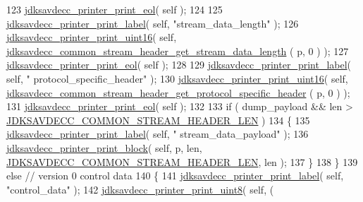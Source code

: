 \begin{DoxyCode}
123                 \hyperlink{group__util_gacda56c9d3d24593a52c999682fa6e6e3}{jdksavdecc\_printer\_print\_eol}( \textcolor{keyword}{self} );
124 
125                 \hyperlink{group__util_gaf7818b24143b3c7502926a425a242ff5}{jdksavdecc\_printer\_print\_label}( \textcolor{keyword}{self}, \textcolor{stringliteral}{"stream\_data\_length"} );
126                 \hyperlink{group__util_ga9793e0ff8e7ed25d957282ee6b257ce2}{jdksavdecc\_printer\_print\_uint16}( \textcolor{keyword}{self}, 
      \hyperlink{group__jdksavdecc__avtp__common__stream__header_ga1457308e7d42adb713a5f130497c9153}{jdksavdecc\_common\_stream\_header\_get\_stream\_data\_length}
      ( p, 0 ) );
127                 \hyperlink{group__util_gacda56c9d3d24593a52c999682fa6e6e3}{jdksavdecc\_printer\_print\_eol}( \textcolor{keyword}{self} );
128 
129                 \hyperlink{group__util_gaf7818b24143b3c7502926a425a242ff5}{jdksavdecc\_printer\_print\_label}( \textcolor{keyword}{self}, \textcolor{stringliteral}{"
      protocol\_specific\_header"} );
130                 \hyperlink{group__util_ga9793e0ff8e7ed25d957282ee6b257ce2}{jdksavdecc\_printer\_print\_uint16}( \textcolor{keyword}{self}, 
      \hyperlink{group__jdksavdecc__avtp__common__stream__header_ga1c1c9e3403005799cc13be253a2fd91f}{jdksavdecc\_common\_stream\_header\_get\_protocol\_specific\_header}
      ( p, 0 ) );
131                 \hyperlink{group__util_gacda56c9d3d24593a52c999682fa6e6e3}{jdksavdecc\_printer\_print\_eol}( \textcolor{keyword}{self} );
132 
133                 \textcolor{keywordflow}{if} ( dump\_payload && len > \hyperlink{group__jdksavdecc__avtp__common__stream__header_ga615d40bf9d23486c5c9bacdc031fb492}{JDKSAVDECC\_COMMON\_STREAM\_HEADER\_LEN}
       )
134                 \{
135                     \hyperlink{group__util_gaf7818b24143b3c7502926a425a242ff5}{jdksavdecc\_printer\_print\_label}( \textcolor{keyword}{self}, \textcolor{stringliteral}{"
      stream\_data\_payload"} );
136                     \hyperlink{group__util_ga18d7b11e396f21996dedde77febcb22f}{jdksavdecc\_printer\_print\_block}( \textcolor{keyword}{self}, p, len, 
      \hyperlink{group__jdksavdecc__avtp__common__stream__header_ga615d40bf9d23486c5c9bacdc031fb492}{JDKSAVDECC\_COMMON\_STREAM\_HEADER\_LEN}, len );
137                 \}
138             \}
139             \textcolor{keywordflow}{else} \textcolor{comment}{// version 0 control data}
140             \{
141                 \hyperlink{group__util_gaf7818b24143b3c7502926a425a242ff5}{jdksavdecc\_printer\_print\_label}( \textcolor{keyword}{self}, \textcolor{stringliteral}{"control\_data"} );
142                 \hyperlink{group__util_ga00205f7730fc39a5b93655a3b18a8dc7}{jdksavdecc\_printer\_print\_uint8}( \textcolor{keyword}{self}, (

\end{DoxyCode}
